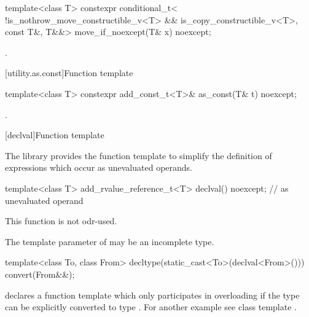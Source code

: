 %
\begin{itemdecl}
template<class T> constexpr conditional_t<
    !is_nothrow_move_constructible_v<T> && is_copy_constructible_v<T>, const T&, T&&>
  move_if_noexcept(T& x) noexcept;
\end{itemdecl}

\begin{itemdescr}
\pnum
\returns
{}.
\end{itemdescr}

[utility.as.const]{Function template }

%
\begin{itemdecl}
template<class T> constexpr add_const_t<T>& as_const(T& t) noexcept;
\end{itemdecl}

\begin{itemdescr}
\pnum
\returns
{}.
\end{itemdescr}

[declval]{Function template }

\pnum
The library provides the function template  to simplify the definition of
expressions which occur as unevaluated operands.

%
\begin{itemdecl}
template<class T> add_rvalue_reference_t<T> declval() noexcept;    // as unevaluated operand
\end{itemdecl}

\begin{itemdescr}
\pnum
\mandates
This function is not odr-used.

\pnum
\remarks
The template parameter  of  may be an incomplete type.
\end{itemdescr}

\pnum
\begin{example}
\begin{codeblock}
template<class To, class From> decltype(static_cast<To>(declval<From>())) convert(From&&);
\end{codeblock}
declares a function template  which only participates in overloading if the
type  can be explicitly converted to type . For another example see class
template .
\end{example}

